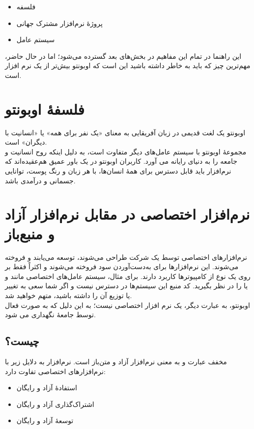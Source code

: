 \begin{itemize}
\item فلسفه
\item پروژهٔ نرم‌افزار مشترک جهانی
\item سیستم عامل
\end{itemize}

این راهنما در تمام این مفاهیم در بخش‌های بعد گسترده می‌شود؛ اما در حال حاضر، مهم‌ترین چیز که باید به خاطر داشته باشید این است که اوبونتو بیش‌تر از یک نرم افزار است.

\section{فلسفهٔ اوبونتو}
اوبونتو یک لغت قدیمی در زبان آفریقایی به معنای «یک نفر برای همه» یا «انسانیت با دیگران» است.\\
مجموعهٔ اوبونتو با سیستم عامل‌های دیگر متفاوت است، به دلیل اینکه روح انسانیت و جامعه را به دنیای رایانه می آورد. کاربران اوبونتو در یک باور عمیق هم‌عقیده‌اند که نرم‌افزار باید قابل دسترس برای همهٔ انسان‌ها، با هر زبان و رنگ پوست، توانایی جسمانی و درآمدی باشد.

\section{نرم‌افزار اختصاصی در مقابل نرم‌افزار آزاد و منبع‌باز}
نرم‌افزارهای اختصاصی توسط یک شرکت طراحی می‌شوند، توسعه می‌یابند و فروخته می‌شوند. این نرم‌افزارها برای به‌دست‌آوردن سود فروخته می‌شوند و اکثراً فقط بر روی یک نوع از کامپیوترها کاربرد دارند. برای مثال، سیستم عامل‌های اختصاصی مانند  و یا  را در نظر بگیرید. کد منبع این سیستم‌ها در دسترس نیست و اگر شما سعی به تغییر یا توزیع آن را داشته باشید، متهم خواهید شد.\\
اوبونتو، به عبارت دیگر، یک نرم افزار اختصاصی نیست؛ به این دلیل که به صورت فعال توسط جامعهٔ  نگهداری می شود.

\subsection*{ چیست؟}
 مخفف عبارت  و به معنی نرم‌افزار آزاد و متن‌باز است. نرم‌افزار  به دلایل زیر با نرم‌افزارهای اختصاصی تفاوت دارد:

\begin{itemize}
\item استفادهٔ آزاد و رایگان
\item اشتراک‌گذاری آزاد و رایگان
\item توسعهٔ آزاد و رایگان
\end{itemize}

